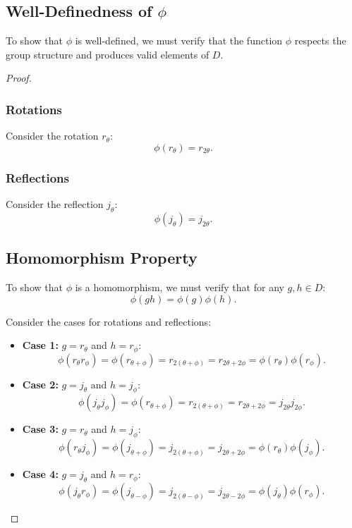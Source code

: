 \documentclass[12pt]{amsart}
\theoremstyle{definition}
\numberwithin{equation}{section}
\begin{document}
\begin{exercise}{3}
\subsection*{Well-Definedness of \(\phi\)}

To show that \(\phi\) is well-defined, we must verify that the function \(\phi\) respects the group structure and produces valid elements of \(D\).

\begin{proof} \( \)

\subsubsection*{Rotations}

Consider the rotation \(r_\theta\):
\[
\phi(r_\theta) = r_{2\theta}.
\]

\subsubsection*{Reflections}

Consider the reflection \(j_\theta\):
\[
\phi(j_\theta) = j_{2\theta}.
\]

\subsection*{Homomorphism Property}

To show that \(\phi\) is a homomorphism, we must verify that for any \(g, h \in D\):
\[
\phi(gh) = \phi(g) \phi(h).
\]

Consider the cases for rotations and reflections:

\begin{itemize}
    \item \textbf{Case 1:} \(g = r_\theta\) and \(h = r_\phi\):
    \[
    \phi(r_\theta r_\phi) = \phi(r_{\theta + \phi}) = r_{2(\theta + \phi)} = r_{2\theta + 2\phi} = \phi(r_\theta) \phi(r_\phi).
    \]
    \item \textbf{Case 2:} \(g = j_\theta\) and \(h = j_\phi\):
    \[
    \phi(j_\theta j_\phi) = \phi(r_{\theta + \phi}) = r_{2(\theta + \phi)} = r_{2\theta + 2\phi} = j_{2\theta} j_{2\phi}.
    \]
    \item \textbf{Case 3:} \(g = r_\theta\) and \(h = j_\phi\):
    \[
    \phi(r_\theta j_\phi) = \phi(j_{\theta + \phi}) = j_{2(\theta + \phi)} = j_{2\theta + 2\phi} = \phi(r_\theta) \phi(j_\phi).
    \]
    \item \textbf{Case 4:} \(g = j_\theta\) and \(h = r_\phi\):
    \[
    \phi(j_\theta r_\phi) = \phi(j_{\theta - \phi}) = j_{2(\theta - \phi)} = j_{2\theta - 2\phi} = \phi(j_\theta) \phi(r_\phi).
    \]
\end{itemize}


\end{proof}
\end{exercise}
\end{document}
